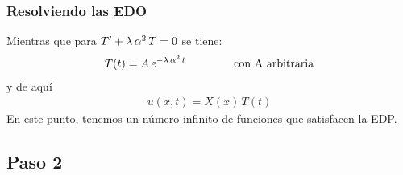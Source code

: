 \documentclass[12pt]{beamer}
\begin{document}
\begin{frame}
\frametitle{Resolviendo las EDO}
Mientras que para ${T}^{\prime} + \lambda \, \alpha^{2} \, T = 0$ se tiene:
\pause
\begin{align}
T (t) = A \, e^{- \lambda \, \alpha^{2} \, t} \hspace{1.5cm} \mbox{con A arbitraria}
\label{eq:ecuacion_06_02_36a}    
\end{align}
y de aquí
\begin{align*}
u (x, t) = X (x) \, T (t) 
\end{align*}
\pause
En este punto, tenemos un número infinito de funciones que satisfacen la EDP.
\end{frame}

\subsection{Paso 2}
\end{document}
